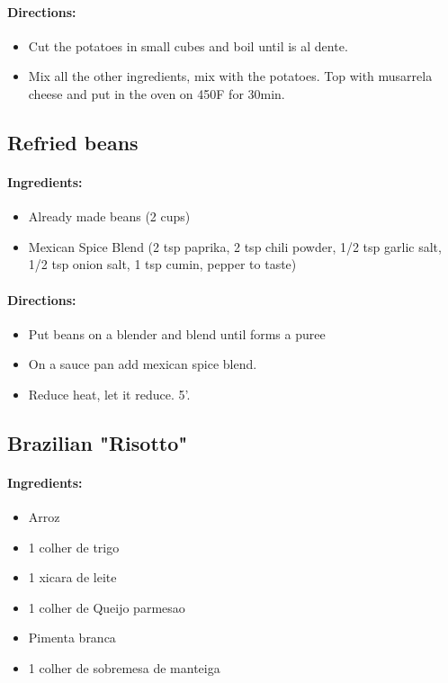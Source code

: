 \documentclass{article}
\begin{document}
\paragraph{Directions:}
\begin{itemize}
	\item Cut the potatoes in small cubes and boil until is al dente.
	\item Mix all the other ingredients, mix with the potatoes. Top with musarrela cheese and put in the oven on 450F for 30min.
\end{itemize}

\subsection{Refried beans}

\paragraph{Ingredients:}

\begin{itemize}
	\item Already made beans (2 cups)
	\item Mexican Spice Blend (2 tsp paprika, 2 tsp chili powder, 1/2 tsp garlic salt, 1/2 tsp onion salt, 1 tsp cumin, pepper to taste)
\end{itemize}

\paragraph{Directions:}
\begin{itemize}
	\item Put beans on a blender and blend until forms a puree
	\item On a sauce pan add mexican spice blend.
	\item Reduce heat, let it reduce. 5'.
\end{itemize} 

\subsection{Brazilian "Risotto"}

\paragraph{Ingredients:}

\begin{itemize}
	\item Arroz
	\item 1 colher de trigo
	\item 1 xicara de leite
	\item 1 colher de Queijo parmesao
	\item Pimenta branca
	\item 1 colher de sobremesa de manteiga
\end{itemize}
\end{document}
